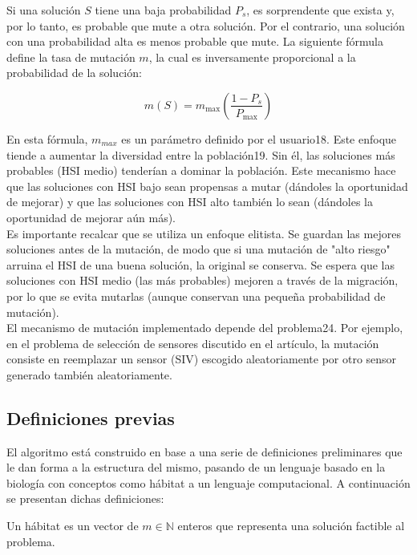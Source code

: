 Si una solución $S$ tiene una baja probabilidad $P_s$, es sorprendente que exista y, por lo tanto, es probable que mute a otra solución. Por el contrario, una solución con una probabilidad alta es menos probable que mute. La siguiente fórmula define la tasa de mutación $m$, la cual es inversamente proporcional a la probabilidad de la solución:

$$m(S) = m_{\text{max}} \left( \frac{1 - P_s}{P_{\text{max}}} \right)$$

En esta fórmula, $m_{max}$ es un parámetro definido por el usuario18. Este enfoque tiende a aumentar la diversidad entre la población19. Sin él, las soluciones más probables (HSI medio) tenderían a dominar la población. Este mecanismo hace que las soluciones con HSI bajo sean propensas a mutar (dándoles la oportunidad de mejorar) y que las soluciones con HSI alto también lo sean (dándoles la oportunidad de mejorar aún más).\\

Es importante recalcar que se utiliza un enfoque elitista. Se guardan las mejores soluciones antes de la mutación, de modo que si una mutación de "alto riesgo" arruina el HSI de una buena solución, la original se conserva. Se espera que las soluciones con HSI medio (las más probables) mejoren a través de la migración, por lo que se evita mutarlas (aunque conservan una pequeña probabilidad de mutación).\\

El mecanismo de mutación implementado depende del problema24. Por ejemplo, en el problema de selección de sensores discutido en el artículo, la mutación consiste en reemplazar un sensor (SIV) escogido aleatoriamente por otro sensor generado también aleatoriamente.

\subsection{Definiciones previas}
\label{sec:meta1_algoritmo}

El algoritmo está construido en base a una serie de definiciones preliminares que le dan forma a la estructura del mismo, pasando de un lenguaje
basado en la biología con conceptos como hábitat a un lenguaje computacional. 
A continuación se presentan dichas definiciones:

\begin{mydef}
    Un hábitat es un vector de $m \in \mathbb{N}$ enteros que representa una solución factible al problema.
\end{mydef}

